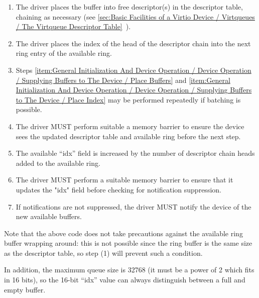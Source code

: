 \begin{enumerate}
\item\label{item:General Initialization And Device Operation / Device Operation / Supplying Buffers to The Device / Place Buffers} The driver places the buffer into free descriptor(s) in the
   descriptor table, chaining as necessary (see \ref{sec:Basic Facilities of a Virtio Device / Virtqueues / The Virtqueue Descriptor Table}~).

\item\label{item:General Initialization And Device Operation / Device Operation / Supplying Buffers to The Device / Place Index} The driver places the index of the head of the descriptor chain
   into the next ring entry of the available ring.

\item Steps \ref{item:General Initialization And Device Operation / Device Operation / Supplying Buffers to The Device / Place Buffers} and \ref{item:General Initialization And Device Operation / Device Operation / Supplying Buffers to The Device / Place Index} may be performed repeatedly if batching
  is possible.

\item The driver MUST perform suitable a memory barrier to ensure the device sees
  the updated descriptor table and available ring before the next
  step.

\item The available “idx” field is increased by the number of
  descriptor chain heads added to the available ring.

\item The driver MUST perform a suitable memory barrier to ensure that it updates
  the "idx" field before checking for notification suppression.

\item If notifications are not suppressed, the driver MUST notify the device
    of the new available buffers.
\end{enumerate}

Note that the above code does not take precautions against the
available ring buffer wrapping around: this is not possible since
the ring buffer is the same size as the descriptor table, so step
(1) will prevent such a condition.

In addition, the maximum queue size is 32768 (it must be a power
of 2 which fits in 16 bits), so the 16-bit “idx” value can always
distinguish between a full and empty buffer.

